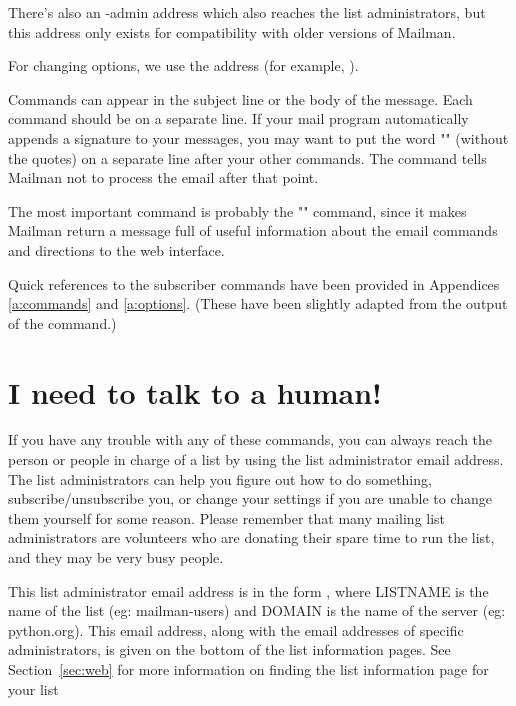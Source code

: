 \documentclass{howto}
\begin{document}
There's also an -admin address which also reaches the list administrators,
but this address only exists for compatibility with older versions of
Mailman.

For changing options, we use the 
address (for example, ).

Commands can appear in the subject line or the body of the message.  Each 
command should be on a separate line.  If your mail program automatically
appends a signature to your messages, you may want to put the word
"" (without the quotes) on a separate line after your other commands. 
The  command tells Mailman not to process the email after that
point.

The most important command is probably the "" command, since it 
makes Mailman return a message full of useful information about the
email commands and directions to the web interface.

Quick references to the subscriber commands have been provided in 
Appendices \ref{a:commands} and \ref{a:options}. (These have been slightly
adapted from the output of the  command.)


\section{I need to talk to a human!\label{sec:human}}

If you have any trouble with any of these commands, you can always reach the
person or people in charge of a list by using the list administrator email address. 
The list administrators can help you figure out
how to do something, subscribe/unsubscribe you, or change your 
settings if you are unable to change them yourself for some reason.  Please
remember that many mailing list administrators are volunteers who are donating
their spare time to run the list, and they may be very busy people.

This list administrator email address is in the form , where LISTNAME is the name of the list (eg: mailman-users) and DOMAIN is
the name of the server (eg: python.org).  
This email address, 
along with the email addresses of specific administrators, is given on the 
bottom of the list information pages. See Section~\ref{sec:web} for more 
information on finding the list information page for your list

\end{document}
